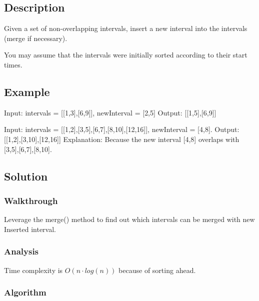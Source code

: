 \documentclass[]{book}
\begin{document}
\hypertarget{description-21}{%
\subsection{Description}\label{description-21}}

Given a set of non-overlapping intervals, insert a new interval into the intervals (merge if necessary).

You may assume that the intervals were initially sorted according to their start times.

\hypertarget{example-20}{%
\subsection{Example}\label{example-20}}

Input: intervals = {[}{[}1,3{]},{[}6,9{]}{]}, newInterval = {[}2,5{]} Output: {[}{[}1,5{]},{[}6,9{]}{]}

Input: intervals = {[}{[}1,2{]},{[}3,5{]},{[}6,7{]},{[}8,10{]},{[}12,16{]}{]}, newInterval = {[}4,8{]}. Output: {[}{[}1,2{]},{[}3,10{]},{[}12,16{]}{]}
Explanation: Because the new interval {[}4,8{]} overlaps with {[}3,5{]},{[}6,7{]},{[}8,10{]}.

\hypertarget{solution-16}{%
\subsection{Solution}\label{solution-16}}

\hypertarget{walkthrough-20}{%
\subsubsection{Walkthrough}\label{walkthrough-20}}

Leverage the merge() method to find out which intervals can be merged with new Inserted interval.

\hypertarget{analysis-22}{%
\subsubsection{Analysis}\label{analysis-22}}

Time complexity is \(O(n \cdot log(n))\) because of sorting ahead.

\hypertarget{algorithm-22}{%
\subsubsection{Algorithm}\label{algorithm-22}}
\end{document}
